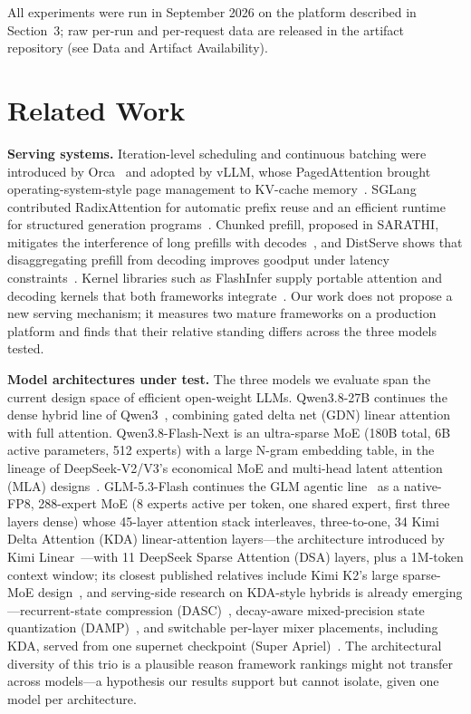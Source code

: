 \documentclass[11pt]{article}
\begin{document}
All experiments were run in September 2026 on the platform described in Section~3; raw per-run and per-request data are released in the artifact repository (see Data and Artifact Availability).

\section{Related Work}

\textbf{Serving systems.} Iteration-level scheduling and continuous batching were introduced by Orca~\cite{yu2022orca} and adopted by vLLM, whose PagedAttention brought operating-system-style page management to KV-cache memory~\cite{kwon2023vllm}. SGLang contributed RadixAttention for automatic prefix reuse and an efficient runtime for structured generation programs~\cite{zheng2024sglang}. Chunked prefill, proposed in SARATHI, mitigates the interference of long prefills with decodes~\cite{agrawal2023sarathi}, and DistServe shows that disaggregating prefill from decoding improves goodput under latency constraints~\cite{zhong2024distserve}. Kernel libraries such as FlashInfer supply portable attention and decoding kernels that both frameworks integrate~\cite{ye2025flashinfer}. Our work does not propose a new serving mechanism; it measures two mature frameworks on a production platform and finds that their relative standing differs across the three models tested.

\textbf{Model architectures under test.} The three models we evaluate span the current design space of efficient open-weight LLMs. Qwen3.8-27B continues the dense hybrid line of Qwen3~\cite{yang2025qwen3}, combining gated delta net (GDN) linear attention with full attention. Qwen3.8-Flash-Next is an ultra-sparse MoE (180B total, 6B active parameters, 512 experts) with a large N-gram embedding table, in the lineage of DeepSeek-V2/V3's economical MoE and multi-head latent attention (MLA) designs~\cite{deepseek2024v3,deepseek2024v2}. GLM-5.3-Flash continues the GLM agentic line~\cite{glm2026glm5} as a native-FP8, 288-expert MoE (8 experts active per token, one shared expert, first three layers dense) whose 45-layer attention stack interleaves, three-to-one, 34 Kimi Delta Attention (KDA) linear-attention layers---the architecture introduced by Kimi Linear~\cite{kimi2025linear}---with 11 DeepSeek Sparse Attention (DSA) layers, plus a 1M-token context window; its closest published relatives include Kimi K2's large sparse-MoE design~\cite{kimi2025k2}, and serving-side research on KDA-style hybrids is already emerging---recurrent-state compression (DASC)~\cite{yu2026dasc}, decay-aware mixed-precision state quantization (DAMP)~\cite{zhang2026damp}, and switchable per-layer mixer placements, including KDA, served from one supernet checkpoint (Super Apriel)~\cite{slam2026superapriel}. The architectural diversity of this trio is a plausible reason framework rankings might not transfer across models---a hypothesis our results support but cannot isolate, given one model per architecture.
\end{document}
